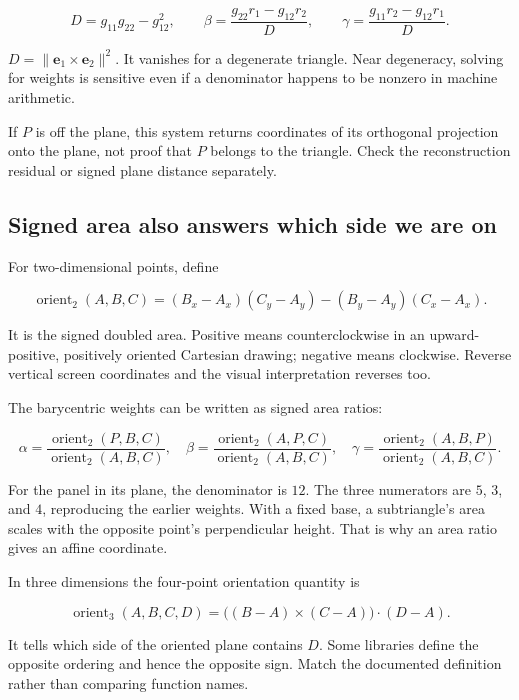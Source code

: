 \[
D=g_{11}g_{22}-g_{12}^2,
\qquad
\beta=\frac{g_{22}r_1-g_{12}r_2}{D},
\qquad
\gamma=\frac{g_{11}r_2-g_{12}r_1}{D}.
\]

\(D=\|\mathbf e_1\times\mathbf e_2\|^2\). It vanishes for a degenerate triangle. Near degeneracy, solving for weights is sensitive even if a denominator happens to be nonzero in machine arithmetic.

If \(P\) is off the plane, this system returns coordinates of its orthogonal projection onto the plane, not proof that \(P\) belongs to the triangle. Check the reconstruction residual or signed plane distance separately.

\subsection{Signed area also answers which side we are on}\label{01-foundations-i-ch018-signed-area-also-answers-which-side-we-are-on}

For two-dimensional points, define

\[
\operatorname{orient}_2(A,B,C)
=(B_x-A_x)(C_y-A_y)-(B_y-A_y)(C_x-A_x).
\]

It is the signed doubled area. Positive means counterclockwise in an upward-positive, positively oriented Cartesian drawing; negative means clockwise. Reverse vertical screen coordinates and the visual interpretation reverses too.

The barycentric weights can be written as signed area ratios:

\[
\alpha=\frac{\operatorname{orient}_2(P,B,C)}{\operatorname{orient}_2(A,B,C)},\quad
\beta=\frac{\operatorname{orient}_2(A,P,C)}{\operatorname{orient}_2(A,B,C)},\quad
\gamma=\frac{\operatorname{orient}_2(A,B,P)}{\operatorname{orient}_2(A,B,C)}.
\]

For the panel in its plane, the denominator is \(12\). The three numerators are \(5\), \(3\), and \(4\), reproducing the earlier weights. With a fixed base, a subtriangle's area scales with the opposite point's perpendicular height. That is why an area ratio gives an affine coordinate.

In three dimensions the four-point orientation quantity is

\[
\operatorname{orient}_3(A,B,C,D)
=\big((B-A)\times(C-A)\big)\cdot(D-A).
\]

It tells which side of the oriented plane contains \(D\). Some libraries define the opposite ordering and hence the opposite sign. Match the documented definition rather than comparing function names.


